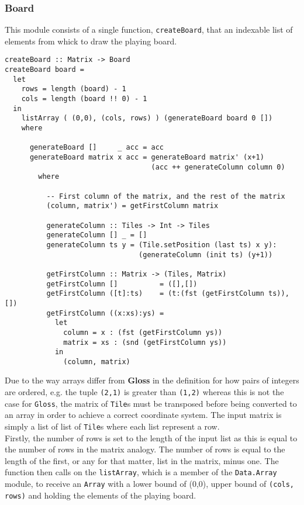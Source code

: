 \documentclass{article}
\begin{document}
        \subsubsection{Board}
        This module consists of a single function, \texttt{createBoard}, that an indexable list of elements from whick to draw the playing board.

\begin{verbatim}
createBoard :: Matrix -> Board
createBoard board =
  let
    rows = length (board) - 1
    cols = length (board !! 0) - 1
  in
    listArray ( (0,0), (cols, rows) ) (generateBoard board 0 [])
    where

      generateBoard []     _ acc = acc
      generateBoard matrix x acc = generateBoard matrix' (x+1)
                                   (acc ++ generateColumn column 0)
        where

          -- First column of the matrix, and the rest of the matrix
          (column, matrix') = getFirstColumn matrix

          generateColumn :: Tiles -> Int -> Tiles
          generateColumn [] _ = []
          generateColumn ts y = (Tile.setPosition (last ts) x y):
                                (generateColumn (init ts) (y+1))

          getFirstColumn :: Matrix -> (Tiles, Matrix)
          getFirstColumn []          = ([],[])
          getFirstColumn ([t]:ts)    = (t:(fst (getFirstColumn ts)), [])
          getFirstColumn ((x:xs):ys) =
            let
              column = x : (fst (getFirstColumn ys))
              matrix = xs : (snd (getFirstColumn ys))
            in
              (column, matrix)
\end{verbatim}
Due to the way arrays differ from \textbf{Gloss} in the definition for how pairs of integers are ordered, e.g. the tuple \texttt{(2,1)} is greater than \texttt{(1,2)} whereas this is not the case for \texttt{Gloss}, the matrix of \texttt{Tile}s must be transposed before being converted to an array in order to achieve a correct coordinate system. The input matrix is simply a list of list of \texttt{Tile}s where each list represent a row.\\
 \newline
 Firstly, the number of rows is set to the length of the input list as this is equal to the number of rows in the matrix analogy. The number of rows is equal to the length of the first, or any for that matter, list in the matrix, minus one. The function then calls on the \texttt{listArray}, which is a member of the \texttt{Data.Array} module, to receive an \texttt{Array} with a lower bound of (0,0), upper bound of \texttt{(cols, rows)} and holding the elements of the playing board.\\
\end{document}
